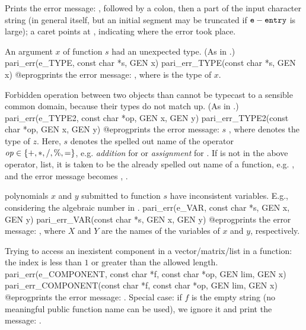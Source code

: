 \noindent Prints the error message: , followed by a colon, then
a part of the input character string (in general  itself, but an
initial segment may be truncated if ${\tt e}-{\tt entry}$ is large); a caret
points at , indicating where the error took place.

 An argument $x$ of function $s$ had an unexpected type.
(As in .)
\bprog
  pari_err(e_TYPE, const char *s, GEN x)
  pari_err_TYPE(const char *s, GEN x)
@eprog\noindent prints the error message: , where  is the type of $x$.

 Forbidden operation between two objects than cannot be
typecast to a sensible common domain, because their types do not match up.
(As in .)
\bprog
  pari_err(e_TYPE2, const char *op, GEN x, GEN y)
  pari_err_TYPE2(const char *op, GEN x, GEN y)
@eprog\noindent prints the error message:  $s$
  , where  denotes the type of $z$.
Here, $s$ denotes the spelled out name of the operator
$\hbox{\it op\/}\in\{{\tt +}, {\tt *}, {\tt /}, {\tt \%}, {\tt =}\}$, e.g.
\emph{addition} for  or \emph{assignment} for . If 
is not in the above operator, list, it is taken to be the already spelled out
name of a function, e.g. , and the error message becomes
  , .

 polynomials $x$ and $y$ submitted to function $s$ have
inconsistent variables. E.g., considering the algebraic number
 in .
\bprog
  pari_err(e_VAR, const char *s, GEN x, GEN y)
  pari_err_VAR(const char *s, GEN x, GEN y)
@eprog\noindent prints the error message: , where $X$ and $Y$ are the names of the variables of $x$ and $y$,
respectively.


 Trying to access an inexistent component in a
vector/matrix/list in a function: the index is less than $1$ or greater
than the allowed length.
\bprog
  pari_err(e_COMPONENT, const char *f, const char *op, GEN lim, GEN x)
  pari_err_COMPONENT(const char *f, const char *op, GEN lim, GEN x)
@eprog\noindent prints the error message: . Special case: if $f$ is the empty string (no
meaningful public function name can be used), we ignore it and print the
message: .

